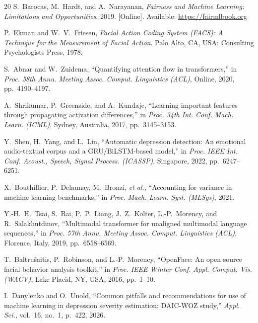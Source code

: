 \documentclass[5p,twocolumn]{elsarticle}
\begin{document}
\begin{thebibliography}{20}
S.~Barocas, M.~Hardt, and A.~Narayanan,
\textit{Fairness and Machine Learning: Limitations and Opportunities}.
2019. [Online]. Available: \url{https://fairmlbook.org}

P.~Ekman and W.~V.~Friesen,
\textit{Facial Action Coding System (FACS): A Technique for the
Measurement of Facial Action}.
Palo Alto, CA, USA: Consulting Psychologists Press, 1978.

S.~Abnar and W.~Zuidema,
``Quantifying attention flow in transformers,'' in
\textit{Proc. 58th Annu. Meeting Assoc. Comput. Linguistics
(ACL)}, Online, 2020, pp.~4190--4197.

A.~Shrikumar, P.~Greenside, and A.~Kundaje,
``Learning important features through propagating activation
differences,'' in \textit{Proc. 34th Int. Conf. Mach. Learn.
(ICML)}, Sydney, Australia, 2017, pp.~3145--3153.

Y.~Shen, H.~Yang, and L.~Lin,
``Automatic depression detection: An emotional audio-textual
corpus and a GRU/BiLSTM-based model,''
in \textit{Proc. IEEE Int. Conf. Acoust., Speech, Signal Process.
(ICASSP)}, Singapore, 2022, pp.~6247--6251.

X.~Bouthillier, P.~Delaunay, M.~Bronzi, \emph{et al.},
``Accounting for variance in machine learning benchmarks,''
in \textit{Proc. Mach. Learn. Syst. (MLSys)}, 2021.

Y.-H.~H.~Tsai, S.~Bai, P.~P.~Liang, J.~Z.~Kolter,
L.-P.~Morency, and R.~Salakhutdinov,
``Multimodal transformer for unaligned multimodal language
sequences,'' in \textit{Proc. 57th Annu. Meeting Assoc.
Comput. Linguistics (ACL)}, Florence, Italy, 2019,
pp.~6558--6569.

T.~Baltru\v{s}aitis, P.~Robinson, and L.-P.~Morency,
``OpenFace: An open source facial behavior analysis toolkit,''
in \textit{Proc. IEEE Winter Conf. Appl. Comput. Vis. (WACV)},
Lake Placid, NY, USA, 2016, pp.~1--10.

I.~Danylenko and O.~Unold,
``Common pitfalls and recommendations for use of machine
learning in depression severity estimation: DAIC-WOZ study,''
\textit{Appl. Sci.}, vol.~16, no.~1, p.~422, 2026.

\end{thebibliography}
\end{document}
